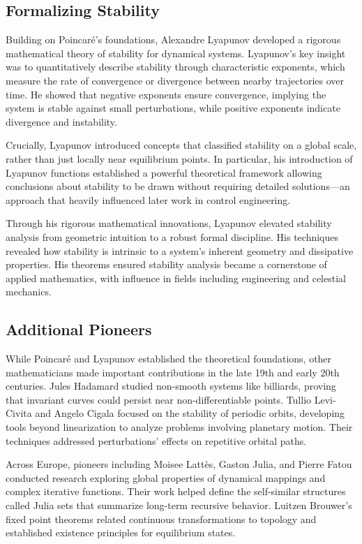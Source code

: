 \subsection{Formalizing Stability}

Building on Poincaré's foundations, Alexandre Lyapunov developed a rigorous mathematical theory of stability for dynamical systems. Lyapunov's key insight was to quantitatively describe stability through characteristic exponents, which measure the rate of convergence or divergence between nearby trajectories over time. He showed that negative exponents ensure convergence, implying the system is stable against small perturbations, while positive exponents indicate divergence and instability.

Crucially, Lyapunov introduced concepts that classified stability on a global scale, rather than just locally near equilibrium points. In particular, his introduction of Lyapunov functions established a powerful theoretical framework allowing conclusions about stability to be drawn without requiring detailed solutions---an approach that heavily influenced later work in control engineering.

Through his rigorous mathematical innovations, Lyapunov elevated stability analysis from geometric intuition to a robust formal discipline. His techniques revealed how stability is intrinsic to a system's inherent geometry and dissipative properties. His theorems ensured stability analysis became a cornerstone of applied mathematics, with influence in fields including engineering and celestial mechanics.

\subsection{Additional Pioneers}

While Poincaré and Lyapunov established the theoretical foundations, other mathematicians made important contributions in the late 19th and early 20th centuries. Jules Hadamard studied non-smooth systems like billiards, proving that invariant curves could persist near non-differentiable points. Tullio Levi-Civita and Angelo Cigala focused on the stability of periodic orbits, developing tools beyond linearization to analyze problems involving planetary motion. Their techniques addressed perturbations' effects on repetitive orbital paths.

Across Europe, pioneers including Moisee Lattès, Gaston Julia, and Pierre Fatou conducted research exploring global properties of dynamical mappings and complex iterative functions. Their work helped define the self-similar structures called Julia sets that summarize long-term recursive behavior. Luitzen Brouwer's fixed point theorems related continuous transformations to topology and established existence principles for equilibrium states.

